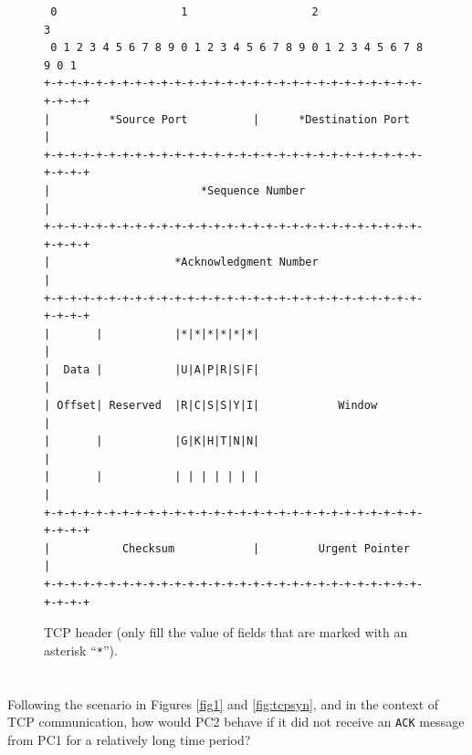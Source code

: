 \documentclass[pdftex,12pt,a4paper]{article}
\begin{document}
        \begin{figure}[!h]
        \centering
        \small\begin{verbatim} 0                   1                   2                   3
 0 1 2 3 4 5 6 7 8 9 0 1 2 3 4 5 6 7 8 9 0 1 2 3 4 5 6 7 8 9 0 1
+-+-+-+-+-+-+-+-+-+-+-+-+-+-+-+-+-+-+-+-+-+-+-+-+-+-+-+-+-+-+-+-+
|         *Source Port          |      *Destination Port        |
+-+-+-+-+-+-+-+-+-+-+-+-+-+-+-+-+-+-+-+-+-+-+-+-+-+-+-+-+-+-+-+-+
|                       *Sequence Number                        |
+-+-+-+-+-+-+-+-+-+-+-+-+-+-+-+-+-+-+-+-+-+-+-+-+-+-+-+-+-+-+-+-+
|                   *Acknowledgment Number                      |
+-+-+-+-+-+-+-+-+-+-+-+-+-+-+-+-+-+-+-+-+-+-+-+-+-+-+-+-+-+-+-+-+
|       |           |*|*|*|*|*|*|                               |
|  Data |           |U|A|P|R|S|F|                               |
| Offset| Reserved  |R|C|S|S|Y|I|            Window             |
|       |           |G|K|H|T|N|N|                               |
|       |           | | | | | | |                               |
+-+-+-+-+-+-+-+-+-+-+-+-+-+-+-+-+-+-+-+-+-+-+-+-+-+-+-+-+-+-+-+-+
|           Checksum            |         Urgent Pointer        |
+-+-+-+-+-+-+-+-+-+-+-+-+-+-+-+-+-+-+-+-+-+-+-+-+-+-+-+-+-+-+-+-+\end{verbatim}\normalsize
        \vspace{-15pt}
        \caption{TCP header (only fill the value of fields that are marked
        with an asterisk ``\texttt{*}'').}
        \label{fig:tcp}
        \end{figure}

        \pagebreak

    \section{}
        Following the scenario in Figures \ref{fig1} and \ref{fig:tcpsyn}, and
        in the context of TCP communication, how would PC2 behave if it did not
        receive an \texttt{ACK} message from PC1 for a relatively long time
        period?
\end{document}
